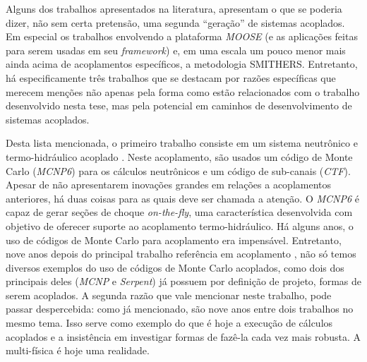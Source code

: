 Alguns dos trabalhos apresentados na literatura, apresentam o que se poderia dizer,
não sem certa pretensão, uma segunda ``geração'' de sistemas acoplados. Em especial os trabalhos
envolvendo a plataforma \textit{MOOSE} (e as aplicações feitas para serem usadas em seu
\textit{framework}) e, em uma escala um pouco menor mais ainda acima de acoplamentos específicos,
a metodologia SMITHERS. Entretanto, há especificamente três trabalhos que se destacam por razões específicas que
merecem menções não apenas pela forma como estão relacionados com o trabalho desenvolvido nesta tese, mas pela
potencial em caminhos de desenvolvimento de sistemas acoplados.

Desta lista mencionada, o primeiro trabalho consiste em um sistema neutrônico e termo-hidráulico
acoplado \cite{Bennett2016}. Neste acoplamento, são usados um código
de Monte Carlo (\textit{MCNP6}) para os cálculos neutrônicos e um código de sub-canais (\textit{CTF}). Apesar de não apresentarem
inovações grandes em relações a acoplamentos anteriores, há duas coisas para as quais deve ser chamada a atenção.
O \textit{MCNP6} é capaz de gerar seções de choque \textit{on-the-fly}, uma característica desenvolvida com objetivo
de oferecer suporte ao acoplamento termo-hidráulico. Há alguns anos, o uso de códigos de Monte Carlo para
acoplamento era impensável. Entretanto, nove anos depois do principal trabalho referência em acoplamento \cite{Ivanov2007}, não só temos
diversos exemplos do uso de códigos de Monte Carlo acoplados, como dois dos principais deles (\textit{MCNP} e \textit{Serpent})
já possuem por definição de projeto, formas de serem acoplados. A segunda razão que vale mencionar neste
trabalho, pode passar despercebida: como já mencionado, são nove anos entre dois trabalhos no mesmo tema.
Isso serve como exemplo do que é hoje a execução de cálculos acoplados e a insistência em
investigar formas de fazê-la cada vez mais robusta. A multi-física é hoje uma realidade.

